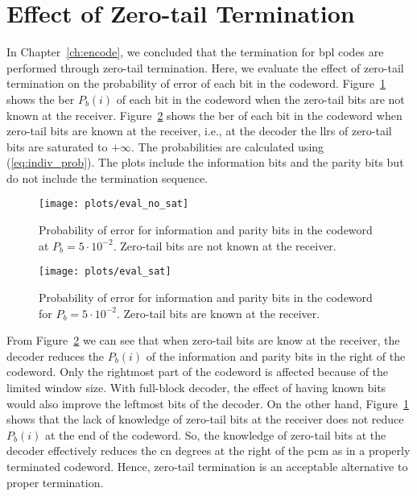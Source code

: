 \section{Effect of Zero-tail Termination}
In Chapter~\ref{ch:encode}, we concluded that the termination for \gls{bpl} codes are performed through zero-tail termination. Here, we evaluate the effect of zero-tail termination on the probability of error of each bit in the codeword. Figure~\ref{fig:eval_no_sat} shows the \gls{ber} $P_b(i)$ of each bit in the codeword when the zero-tail bits are not known at the receiver. Figure~\ref{fig:eval_sat} shows the \gls{ber} of each bit in the codeword when zero-tail bits are known at the receiver, i.e., at the decoder the \glspl{llr} of zero-tail bits are saturated to $+\infty$. The probabilities are calculated using (\ref{eq:indiv_prob}).  The plots include the information bits and the parity bits but do not include the termination sequence.
\begin{figure}[htbp]
  \centering
  \texttt{[image: plots/eval\_no\_sat]}
  \caption[$P_b(i)$ when zero-tail bits are not known at receiver.]{Probability of error for information and parity bits in the codeword at $P_b=5\cdot 10^{-2}$. Zero-tail bits are not known at the receiver.}
  \label{fig:eval_no_sat}
\end{figure}

\begin{figure}[htbp]
  \centering
  \texttt{[image: plots/eval\_sat]}
  \caption[$P_b(i)$ when zero-tail bits are known at receiver.]{Probability of error for information and parity bits in the codeword for $P_b=5\cdot 10^{-2}$. Zero-tail bits are known at the receiver.}
  \label{fig:eval_sat}
\end{figure}
 
From Figure~\ref{fig:eval_sat} we can see that when zero-tail bits are know at the receiver, the decoder reduces the $P_b(i)$ of the information and parity bits in the right of the codeword. Only the rightmost part of the codeword is affected because of the limited window size. With full-block decoder, the effect of having known bits would also improve the leftmost bits of the decoder. On the other hand, Figure~\ref{fig:eval_no_sat} shows that the lack of knowledge of zero-tail bits at the receiver does not reduce $P_b(i)$ at the end of the codeword. So, the knowledge of zero-tail bits at the decoder effectively reduces the \gls{cn} degrees at the right of the \gls{pcm} as in a properly terminated codeword. Hence, zero-tail termination is an acceptable alternative to proper termination.
 
